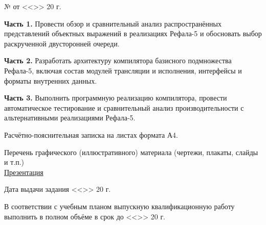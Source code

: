 \vspace{0.6em}
\noindent{}

\vspace{0.3em}
\noindent\underline{\hspace{4.0cm}} № \underline{\hspace{2.8cm}} от <<\underline{\hspace{0.8cm}}>> \underline{\hspace{2.8cm}} 20\underline{\hspace{0.8cm}} г.

\vspace{0.5em}
\begingroup
\setlength{\parindent}{1.25cm}
\setlength{\parskip}{0.7em}

\textbf{Часть 1.} Провести обзор и сравнительный анализ распространённых представлений объектных выражений в реализациях Рефала-5 и обосновать выбор раскрученной двусторонней очереди.

\newpage
\textbf{Часть 2.} Разработать архитектуру компилятора базисного подмножества Рефала-5, включая состав модулей трансляции и исполнения, интерфейсы и форматы внутренних данных.

\textbf{Часть 3.} Выполнить программную реализацию компилятора, провести автоматическое тестирование и сравнительный анализ производительности с альтернативными реализациями Рефала-5.


\noindent Расчётно-пояснительная записка на \underline{\hspace{1.8cm}} листах формата А4.

\noindent Перечень графического (иллюстративного) материала (чертежи, плакаты, слайды и т.п.)\\
\underline{Презентация\hfill}

\noindent Дата выдачи задания <<\underline{\hspace{0.7cm}}>> \underline{\hspace{2.4cm}} 20\underline{\hspace{0.7cm}} г.

В соответствии с учебным планом выпускную квалификационную работу выполнить в полном объёме в срок до <<\underline{\hspace{0.7cm}}>> \underline{\hspace{2.4cm}} 20\underline{\hspace{0.7cm}} г.
\endgroup

